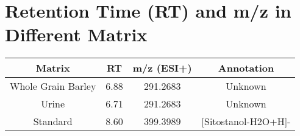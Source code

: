 \section{Retention Time (RT) and m/z in Different Matrix}
\begin{tabular}{|c|c|c|c|}
	\hline 
	Matrix & RT & m/z (ESI+) & Annotation \\ 
	\hline 
	Whole Grain Barley & 6.88 & 291.2683 & Unknown \\ 
	\hline 
	Urine & 6.71 & 291.2683 & Unknown \\ 
	\hline 
	Standard & 8.60 & 399.3989 & [Sitostanol-H2O+H]- \\ 
	\hline 
\end{tabular} 